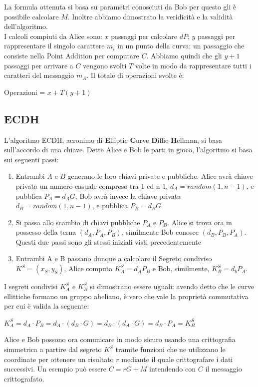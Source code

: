 \documentclass[a4paper,12pt]{tesiinfo}
\begin{document}
La formula ottenuta si basa su parametri conosciuti da Bob per questo gli \`e possibile calcolare $M$. Inoltre abbiamo dimostrato la veridicit\`a e la validit\`a dell'algoritmo.
\\
I calcoli compiuti da Alice sono: $x$ passaggi per calcolare $dP$; $y$ passaggi per rappresentare il singolo carattere $m_i$ in un punto della curva; un passaggio che consiste nella Point Addition per computare $C$. Abbiamo quindi che gli $y+1$ passaggi per arrivare a $C$ vengono svolti $T$ volte in modo da rappresentare tutti i caratteri del messaggio $m_A$. Il totale di operazioni svolte \`e:
\begin{center}
 Operazioni = $x + T(y+1)$
\end{center}
%
%
%
%
%
%
%
%
%
\subsection{ECDH}
\label{ecdh}
L'algoritmo ECDH, acronimo di \textbf{E}lliptic \textbf{C}urve \textbf{D}iffie-\textbf{H}ellman, si basa sull'accordo di una chiave. Dette Alice e Bob le parti in gioco, l'algoritmo si basa sui seguenti passi:
\begin{enumerate}
 \item Entrambi $A$ e $B$ generano le loro chiavi private e pubbliche. Alice avr\`a chiave privata un numero casuale compreso tra 1 ed n-1, $d_A = random(1, n-1)$, e pubblica $P_A = d_AG$; Bob avr\`a invece la chiave privata $d_B = random(1, n-1)$, e pubblica $P_B = d_BG$
 
 \item Si passa allo scambio di chiavi pubbliche $P_A$ e $P_B$. Alice si trova ora in possesso della terna $(d_A, P_A, P_B)$, similmente Bob conosce $(d_B, P_B, P_A)$. Questi due passi sono gli stessi iniziali visti precedentemente
 
 \item Entrambi A e B passano dunque a calcolare il Segreto condiviso $K^S = (x_S, y_S)$, Alice computa $K_A^S = d_AP_B$ e Bob, similmente, $K_B^S = d_bP_A$.
\end{enumerate}
I segreti condivisi $K_A^S$ e $K_B^S$ si dimostrano essere uguali: avendo detto che le curve ellittiche formano un gruppo abeliano, \`e vero che vale la propriet\`a commutativa per cui \`e valida la seguente:
\begin{center}
 $K_A^S = d_A \cdot P_B = d_A \cdot (d_B \cdot G) = d_B \cdot (d_A \cdot G) = d_B \cdot P_A = K_B^S$
\end{center}
Alice e Bob possono ora comunicare in modo sicuro usando una crittografia simmetrica a partire dal segreto $K^S$ tramite funzioni che ne utilizzano le coordinate per ottenere un risultato $r$ mediante il quale crittografare i dati successivi. Un esempio pu\`o essere $C=rG+M$ intendendo con $C$ il messaggio crittografato.
\end{document}
